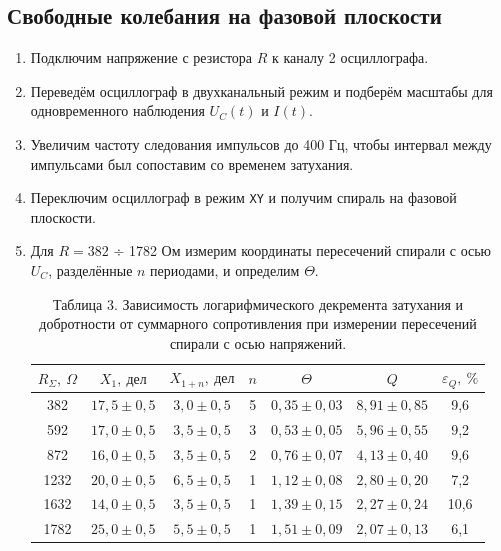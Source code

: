\documentclass[a4paper]{article}
\begin{document}
\subsection{Свободные колебания на фазовой плоскости}
\begin{enumerate}
    \item Подключим напряжение с резистора $R$ к каналу 2 осциллографа.
    \item Переведём осциллограф в двухканальный режим и подберём масштабы для одновременного наблюдения $U_C(t)$ и $I(t)$.
    \item Увеличим частоту следования импульсов до 400 Гц, чтобы интервал между импульсами был сопоставим со временем затухания.
    \item Переключим осциллограф в режим \texttt{XY} и получим спираль на фазовой плоскости.
    \item Для $R = 382$ ÷ 1782 Ом измерим координаты пересечений спирали с осью $U_C$, разделённые $n$ периодами, и определим $\Theta$.

\begin{table}[h!]
    \centering
    \begin{tabular}{|c|c|c|c|c|c|c|}
        \hline
        $R_\Sigma,\ \Omega$ & $X_1,\ \text{дел}$ & $X_{1+n},\ \text{дел}$ & $n$ & $\Theta$ & $Q$ & $\varepsilon_Q,\ \%$ \\ \hline
        382 & $17{,}5 \pm 0{,}5$ & $3{,}0 \pm 0{,}5$ & 5 & $0{,}35 \pm 0{,}03$ & $8{,}91 \pm 0{,}85$ & 9{,}6 \\ \hline
        592 & $17{,}0 \pm 0{,}5$ & $3{,}5 \pm 0{,}5$ & 3 & $0{,}53 \pm 0{,}05$ & $5{,}96 \pm 0{,}55$ & 9{,}2 \\ \hline
        872 & $16{,}0 \pm 0{,}5$ & $3{,}5 \pm 0{,}5$ & 2 & $0{,}76 \pm 0{,}07$ & $4{,}13 \pm 0{,}40$ & 9{,}6 \\ \hline
        1232 & $20{,}0 \pm 0{,}5$ & $6{,}5 \pm 0{,}5$ & 1 & $1{,}12 \pm 0{,}08$ & $2{,}80 \pm 0{,}20$ & 7{,}2 \\ \hline
        1632 & $14{,}0 \pm 0{,}5$ & $3{,}5 \pm 0{,}5$ & 1 & $1{,}39 \pm 0{,}15$ & $2{,}27 \pm 0{,}24$ & 10{,}6 \\ \hline
        1782 & $25{,}0 \pm 0{,}5$ & $5{,}5 \pm 0{,}5$ & 1 & $1{,}51 \pm 0{,}09$ & $2{,}07 \pm 0{,}13$ & 6{,}1 \\ \hline
    \end{tabular}
    \caption{Таблица 3. Зависимость логарифмического декремента затухания и добротности от суммарного сопротивления при измерении пересечений спирали с осью напряжений.}
    \label{tab:theta_q_divisions}
\end{table}
\end{enumerate}
\end{document}
